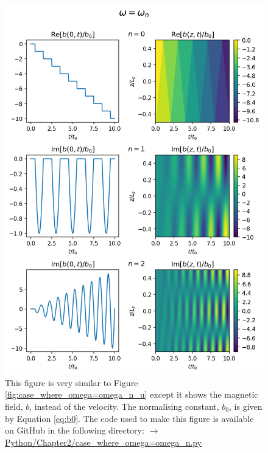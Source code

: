 \begin{figure}
    \centering
    \vspace{-20pt}
    \includegraphics[width=\textwidth,height=0.9\textheight,keepaspectratio]{figures/chapter02/case_where_omega=omega_n_b.png}
    \vspace{-10pt}
    \caption{This figure is very similar to Figure \ref{fig:case_where_omega=omega_n_u} except it shows the magnetic field, $b$, instead of the velocity. The normalising constant, $b_0$, is given by Equation \eqref{eq:b0}. The code used to make this figure is available on GitHub in the following directory:\newline
     \href{https://github.com/aleksyprok/apkp_thesis/blob/main/Python/Chapter2/case_where_omega\%3Domega_n.py}{$\rightarrow$ Python/Chapter2/case\_where\_omega=omega\_n.py}}
    \vspace{-30pt}
    \label{fig:case_where_omega=omega_n_b}
\end{figure}

